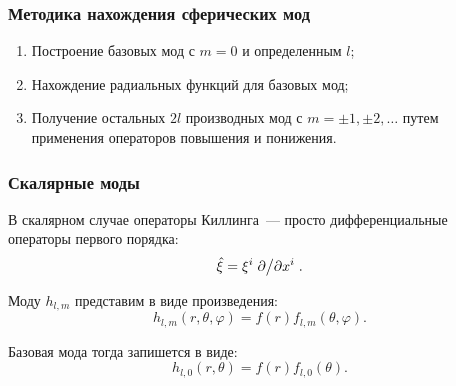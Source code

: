 \documentclass{beamer}
\begin{document}

    \begin{frame}\frametitle{Методика нахождения сферических мод}

        \begin{enumerate}
            \item Построение базовых мод с $m = 0$ и определенным $l$;
            \item Нахождение радиальных функций для базовых мод;
            \item Получение остальных $2l$ производных мод с $m = \pm 1, \pm 2, \dots$ путем применения операторов повышения и понижения.
        \end{enumerate}

    \end{frame}


    \begin{frame}\frametitle{Скалярные моды}

        В скалярном случае операторы Киллинга~--- просто дифференциальные операторы первого порядка:
        \begin{equation}
            \hat{\mathbf{\xi}} = \xi^i \pdv*{x^i} .
        \end{equation}

        Моду $h_{l,m}$ представим в виде произведения:
        \begin{equation}
            h_{l,m}(r,\theta,\varphi) = f(r) f_{l,m}(\theta,\varphi) .
        \end{equation}

        Базовая мода тогда запишется в виде:
        \begin{equation}
            h_{l,0}(r,\theta) = f(r) f_{l,0}(\theta) .
        \end{equation}

    \end{frame}

\end{document}
